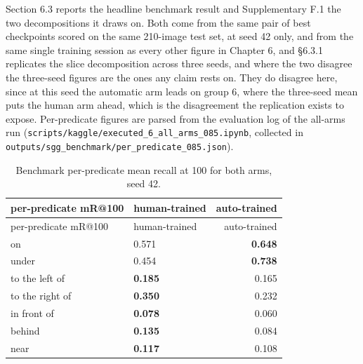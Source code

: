 Section 6.3 reports the headline benchmark result and Supplementary F.1 the two decompositions it draws on. Both come from the same pair of best checkpoints scored on the same 210-image test set, at seed 42 only, and from the same single training session as every other figure in Chapter 6, and \S{}6.3.1 replicates the slice decomposition across three seeds, and where the two disagree the three-seed figures are the ones any claim rests on. They do disagree here, since at this seed the automatic arm leads on group 6, where the three-seed mean puts the human arm ahead, which is the disagreement the replication exists to expose. Per-predicate figures are parsed from the evaluation log of the all-arms run (\texttt{scripts/kaggle/executed\_\allowbreak{}6\_\allowbreak{}all\_\allowbreak{}arms\_\allowbreak{}085.ipynb}, collected in \texttt{outputs/sgg\_\allowbreak{}benchmark/per\_\allowbreak{}predicate\_\allowbreak{}085.json}).

\begin{center}
\setlength{\tabcolsep}{6pt}
\small
\begin{longtable}{llr}
\caption{Benchmark per-predicate mean recall at 100 for both arms, seed 42.}\\
\hline
per-predicate mR@100 & human-trained & auto-trained \\
\hline
\endfirsthead
\hline
per-predicate mR@100 & human-trained & auto-trained \\
\hline
\endhead
on & 0.571 & \textbf{0.648} \\
under & 0.454 & \textbf{0.738} \\
to the left of & \textbf{0.185} & 0.165 \\
to the right of & \textbf{0.350} & 0.232 \\
in front of & \textbf{0.078} & 0.060 \\
behind & \textbf{0.135} & 0.084 \\
near & \textbf{0.117} & 0.108 \\
\hline
\end{longtable}
\end{center}

